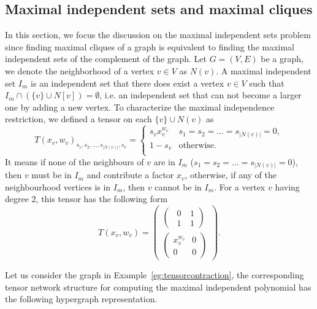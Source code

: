 \documentclass[onefignum, onetabnum]{siamart190516}
\newcommand{\<}{\langle}
\renewcommand{\>}{\rangle}
\begin{document}
\subsection{Maximal independent sets and maximal cliques}\label{sec:maximal}
In this section, we focus the discussion on the maximal independent sets problem since finding maximal cliques of a graph is equivalent to finding the maximal independent sets of the complement of the graph.
Let $G=(V,E)$ be a graph, we denote the neighborhood of a vertex $v\in V$ as $N(v)$.
A maximal independent set $I_m$ is an independent set that there does exist a vertex $v \in V$ such that $I_m \cap (\{v\} \cup N[v])  = \emptyset$, i.e. an independent set that can not become a larger one by adding a new vertex.
To characterize the maximal independence restriction, we defined a tensor on each $\{v\}\cup N(v)$ as
\begin{equation}\label{eq:maximal}
    T(x_v, w_v)_{s_1,s_2,\ldots,s_{|N(v)|},s_v} = \begin{cases}
        s_vx_v^{w_v} & s_1=s_2=\ldots=s_{|N(v)|}=0,\\
        1-s_v& \text{otherwise}.\\
    \end{cases}
\end{equation}
It means if none of the neighbours of $v$ are in $I_{m}$ ($ s_1=s_2=\ldots=s_{|N(v)|}=0$), then $v$ must be in $I_{m}$ and contribute a factor $x_{v}$, otherwise, if any of the neighbourhood vertices is in $I_{m}$, then $v$ cannot be in $I_{m}$.
For a vertex $v$ having degree 2, this tensor has the following form
\begin{equation}
    T(x_v, w_v)=\left(\begin{matrix}
    \left(\begin{matrix}
        ~~0 &~1 \\
        ~~1 &~1
    \end{matrix}\right)\\
    \left(\begin{matrix}
        x_v^{w_v} &0 \\
        0 &0
    \end{matrix}\right)
    \end{matrix}\right).
\end{equation}
 
Let us consider the graph in Example~\ref{eg:tensorcontraction}, the corresponding tensor network structure for computing the maximal independent polynomial has the following hypergraph representation.
\end{document}
